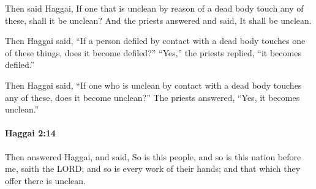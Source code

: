 			\begin{versebox}
					\item[BHS] 
					\item[LXX] 
					\item[ASV] Then said Haggai, If one that is unclean by reason of a dead body touch any of these, shall it be unclean? And the priests answered and said, It shall be unclean.
					\item[NIV] Then Haggai said, “If a person defiled by contact with a dead body touches one of these things, does it become defiled?” “Yes,” the priests replied, “it becomes defiled.”
					\item[NRSV] Then Haggai said, “If one who is unclean by contact with a dead body touches any of these, does it become unclean?” The priests answered, “Yes, it becomes unclean.”
			\end{versebox}

		\paragraph{Haggai 2:14} %
			\label{HAGGAI-2-14}

			Then answered Haggai, and said, So is this people, and so is this nation before me, saith the LORD; and so is every work of their hands; and that which they offer there is unclean.

